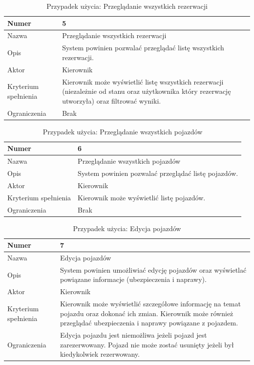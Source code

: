 \documentclass[eng,printmode,openany]{mgr}
\begin{document}
	\begin{table}[H]
		\caption{Przypadek użycia: Przeglądanie wszystkich rezerwacji}
		\begin{tabularx}{\textwidth}{|l|X|}
			\hline
			Numer                & 5  \\ \hline
			Nazwa                & Przeglądanie wszystkich rezerwacji \\ \hline
			Opis                 & System powinien pozwalać przeglądać listę wszystkich rezerwacji. \\ \hline
			Aktor                & Kierownik \\ \hline
			Kryterium spełnienia & Kierownik może wyświetlić listę wszystkich rezerwacji (niezależnie od stanu oraz użytkownika który rezerwację utworzyła) oraz filtrować wyniki. \\ \hline
			Ograniczenia         & Brak \\ \hline
		\end{tabularx}
	\end{table}
	
	\begin{table}[H]
		\caption{Przypadek użycia: Przeglądanie wszystkich pojazdów}
		\begin{tabularx}{\textwidth}{|l|X|}
			\hline
			Numer                & 6  \\ \hline
			Nazwa                & Przeglądanie wszystkich pojazdów \\ \hline
			Opis                 & System powinien pozwalać przeglądać listę pojazdów. \\ \hline
			Aktor                & Kierownik \\ \hline
			Kryterium spełnienia & Kierownik może wyświetlić listę pojazdów. \\ \hline
			Ograniczenia         & Brak  \\ \hline
		\end{tabularx}
	\end{table}
	
	\begin{table}[H]
		\caption{Przypadek użycia: Edycja pojazdów}
		\begin{tabularx}{\textwidth}{|l|X|}
			\hline
			Numer                & 7  \\ \hline
			Nazwa                & Edycja pojazdów \\ \hline
			Opis                 & System powinien umożliwiać edycję pojazdów oraz wyświetlać powiązane informacje (ubezpieczenia i naprawy). \\ \hline
			Aktor                & Kierownik \\ \hline
			Kryterium spełnienia & Kierownik może wyświetlić szczegółowe informację na temat pojazdu oraz dokonać ich zmian. Kierownik może również przeglądać ubezpieczenia i naprawy powiązane z pojazdem. \\ \hline
			Ograniczenia         & Edycja pojazdu jest niemożliwa jeżeli pojazd jest zarezerwowany. Pojazd nie może zostać usunięty jeżeli był kiedykolwiek rezerwowany. \\ \hline
		\end{tabularx}
	\end{table}
	
\end{document}
